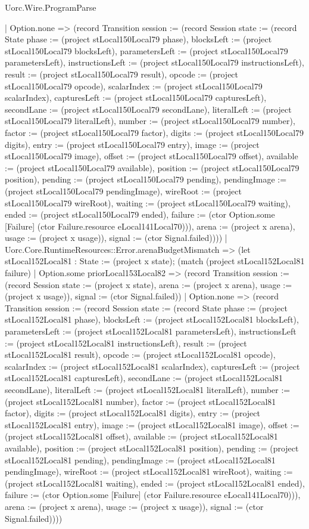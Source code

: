 \begin{lexlean}{Uorc.Wire.ProgramParse}
\begin{semanticmodule}
{        | Option.none => (record Transition {session := (record Session {state := (record State {phase := (project stLocal150Local79 phase), blocksLeft := (project stLocal150Local79 blocksLeft), parametersLeft := (project stLocal150Local79 parametersLeft), instructionsLeft := (project stLocal150Local79 instructionsLeft), result := (project stLocal150Local79 result), opcode := (project stLocal150Local79 opcode), scalarIndex := (project stLocal150Local79 scalarIndex), capturesLeft := (project stLocal150Local79 capturesLeft), secondLane := (project stLocal150Local79 secondLane), literalLeft := (project stLocal150Local79 literalLeft), number := (project stLocal150Local79 number), factor := (project stLocal150Local79 factor), digits := (project stLocal150Local79 digits), entry := (project stLocal150Local79 entry), image := (project stLocal150Local79 image), offset := (project stLocal150Local79 offset), available := (project stLocal150Local79 available), position := (project stLocal150Local79 position), pending := (project stLocal150Local79 pending), pendingImage := (project stLocal150Local79 pendingImage), wireRoot := (project stLocal150Local79 wireRoot), waiting := (project stLocal150Local79 waiting), ended := (project stLocal150Local79 ended), failure := (ctor Option.some [Failure] (ctor Failure.resource eLocal141Local70))}), arena := (project x arena), usage := (project x usage)}), signal := (ctor Signal.failed)})))
      | Uorc.Core.RuntimeResources::Error.arenaBudgetMismatch => (let stLocal152Local81 : State := (project x state); (match (project stLocal152Local81 failure)
        | Option.some priorLocal153Local82 => (record Transition {session := (record Session {state := (project x state), arena := (project x arena), usage := (project x usage)}), signal := (ctor Signal.failed)})
        | Option.none => (record Transition {session := (record Session {state := (record State {phase := (project stLocal152Local81 phase), blocksLeft := (project stLocal152Local81 blocksLeft), parametersLeft := (project stLocal152Local81 parametersLeft), instructionsLeft := (project stLocal152Local81 instructionsLeft), result := (project stLocal152Local81 result), opcode := (project stLocal152Local81 opcode), scalarIndex := (project stLocal152Local81 scalarIndex), capturesLeft := (project stLocal152Local81 capturesLeft), secondLane := (project stLocal152Local81 secondLane), literalLeft := (project stLocal152Local81 literalLeft), number := (project stLocal152Local81 number), factor := (project stLocal152Local81 factor), digits := (project stLocal152Local81 digits), entry := (project stLocal152Local81 entry), image := (project stLocal152Local81 image), offset := (project stLocal152Local81 offset), available := (project stLocal152Local81 available), position := (project stLocal152Local81 position), pending := (project stLocal152Local81 pending), pendingImage := (project stLocal152Local81 pendingImage), wireRoot := (project stLocal152Local81 wireRoot), waiting := (project stLocal152Local81 waiting), ended := (project stLocal152Local81 ended), failure := (ctor Option.some [Failure] (ctor Failure.resource eLocal141Local70))}), arena := (project x arena), usage := (project x usage)}), signal := (ctor Signal.failed)})))
}
\end{semanticmodule}
\end{lexlean}
